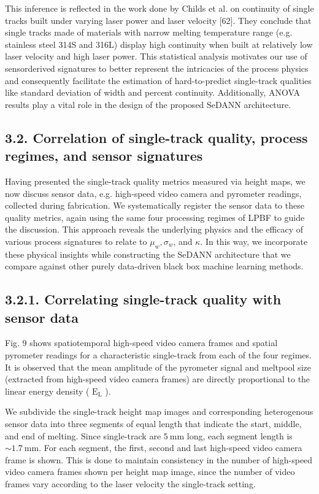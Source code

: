\documentclass[10pt]{article}
\begin{document}
This inference is reflected in the work done by Childs et al. on continuity of single tracks built under varying laser power and laser velocity [62]. They conclude that single tracks made of materials with narrow melting temperature range (e.g. stainless steel 314S and 316L) display high continuity when built at relatively low laser velocity and high laser power. This statistical analysis motivates our use of sensorderived signatures to better represent the intricacies of the process physics and consequently facilitate the estimation of hard-to-predict single-track qualities like standard deviation of width and percent continuity. Additionally, ANOVA results play a vital role in the design of the proposed SeDANN architecture.

\subsection*{3.2. Correlation of single-track quality, process regimes, and sensor signatures}
Having presented the single-track quality metrics measured via height maps, we now discuss sensor data, e.g. high-speed video camera and pyrometer readings, collected during fabrication. We systematically register the sensor data to these quality metrics, again using the same four processing regimes of LPBF to guide the discussion. This approach reveals the underlying physics and the efficacy of various process signatures to relate to $\mu_{w}, \sigma_{w}$, and $\kappa$. In this way, we incorporate these physical insights while constructing the SeDANN architecture that we compare against other purely data-driven black box machine learning methods.

\subsection*{3.2.1. Correlating single-track quality with sensor data}
Fig. 9 shows spatiotemporal high-speed video camera frames and spatial pyrometer readings for a characteristic single-track from each of the four regimes. It is observed that the mean amplitude of the pyrometer signal and meltpool size (extracted from high-speed video camera frames) are directly proportional to the linear energy density ( $\mathrm{E}_{\mathrm{L}}$ ).

We subdivide the single-track height map images and corresponding heterogenous sensor data into three segments of equal length that indicate the start, middle, and end of melting. Since single-track are $5 \mathrm{~mm}$ long, each segment length is $\sim 1.7 \mathrm{~mm}$. For each segment, the first, second and last high-speed video camera frame is shown. This is done to maintain consistency in the number of high-speed video camera frames shown per height map image, since the number of video frames vary according to the laser velocity the single-track setting.
\end{document}
